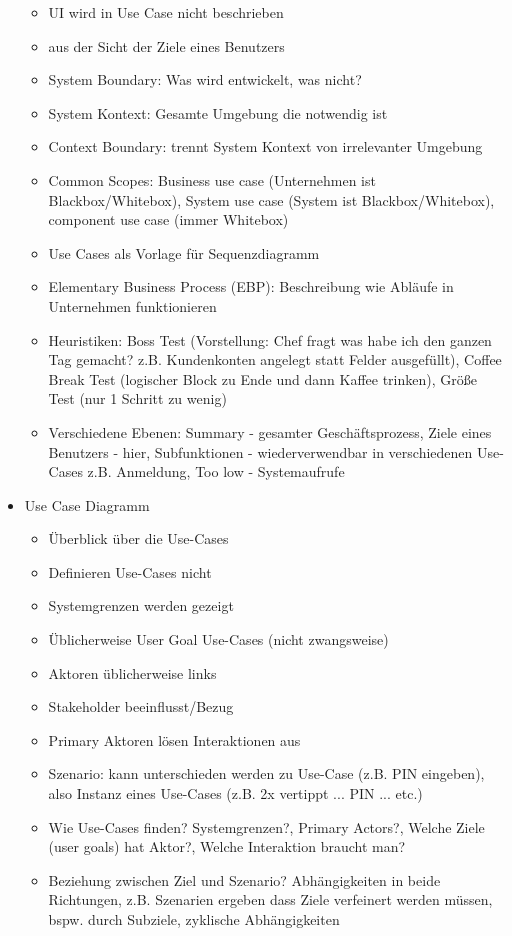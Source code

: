 \documentclass[paper=a4, fontsize=11pt]{scrartcl} %
\numberwithin{equation}{section} %
\numberwithin{figure}{section} %
\numberwithin{table}{section} %
\begin{document}
\begin{itemize}
\begin{itemize}
    \item UI wird in Use Case nicht beschrieben
    \item aus der Sicht der Ziele eines Benutzers
    \item System Boundary: Was wird entwickelt, was nicht?
    \item System Kontext: Gesamte Umgebung die notwendig ist
    \item Context Boundary: trennt System Kontext von irrelevanter Umgebung
    \item Common Scopes: Business use case (Unternehmen ist Blackbox/Whitebox), System use case (System ist Blackbox/Whitebox), component use case (immer Whitebox)
    \item Use Cases als Vorlage für Sequenzdiagramm
    \item Elementary Business Process (EBP): Beschreibung wie Abläufe in Unternehmen funktionieren
    \item Heuristiken: Boss Test (Vorstellung: Chef fragt was habe ich den ganzen Tag gemacht? z.B. Kundenkonten angelegt statt Felder ausgefüllt), Coffee Break Test (logischer Block zu Ende und dann Kaffee trinken), Größe Test (nur 1 Schritt zu wenig)
    \item Verschiedene Ebenen: Summary - gesamter Geschäftsprozess, Ziele eines Benutzers - hier, Subfunktionen - wiederverwendbar in verschiedenen Use-Cases z.B. Anmeldung, Too low - Systemaufrufe
  \end{itemize}
  \item Use Case Diagramm
  \begin{itemize}
    \item Überblick über die Use-Cases
    \item Definieren Use-Cases nicht
    \item Systemgrenzen werden gezeigt
    \item Üblicherweise User Goal Use-Cases (nicht zwangsweise)
    \item Aktoren üblicherweise links
    \item Stakeholder beeinflusst/Bezug
    \item Primary Aktoren lösen Interaktionen aus
    \item Szenario: kann unterschieden werden zu Use-Case (z.B. PIN eingeben), also Instanz eines Use-Cases (z.B. 2x vertippt ... PIN ... etc.)
    \item Wie Use-Cases finden? Systemgrenzen?, Primary Actors?, Welche Ziele (user goals) hat Aktor?, Welche Interaktion braucht man?
    \item Beziehung zwischen Ziel und Szenario? Abhängigkeiten in beide Richtungen, z.B. Szenarien ergeben dass Ziele verfeinert werden müssen, bspw. durch Subziele, zyklische Abhängigkeiten

\end{itemize}
\end{itemize}
\end{document}
